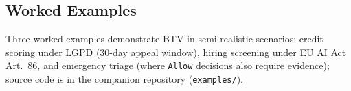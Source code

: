 \subsection{Worked Examples}
\label{sec:worked-examples}

Three worked examples demonstrate BTV in semi-realistic scenarios: credit
scoring under LGPD (30-day appeal window), hiring screening under EU AI Act
Art.~86, and emergency triage (where \texttt{Allow} decisions also require
evidence); source code is in the companion repository
(\texttt{examples/}).
